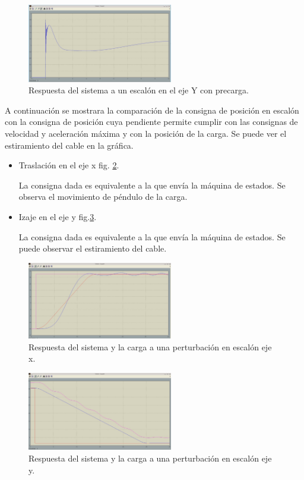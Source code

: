 \documentclass[journal]{IEEEtran}
\begin{document}
\begin{figure}[!t]
 \centering
  \includegraphics[width=2.5in]{Controlador_prec_res.jpeg}
  \caption{Respuesta del sistema a un escalón en el eje Y con precarga.}
  \label{fig:resyComp}
\end{figure}

A continuación se mostrara la comparación de la consigna de posición en escalón con
la consigna de posición cuya pendiente permite cumplir con las consignas de velocidad
y aceleración máxima y con la posición de la carga. Se puede ver el estiramiento del
cable en la gráfica.
\begin{itemize}
 \item Traslación en el eje x fig. \ref{fig:consposxxl}.
 
 La consigna dada es equivalente a la que envía la máquina de estados. Se observa
 el movimiento de péndulo de la carga.
 \item Izaje en el eje y fig.\ref{fig:consposyyl}.
 
  La consigna dada es equivalente a la que envía la máquina de estados. Se puede 
  observar el estiramiento del cable.
\end{itemize}

\begin{figure}[!t]
 \centering
  \includegraphics[width=2.5in]{consx_posx_xl.jpeg}
  \caption{Respuesta del sistema y la carga a una perturbación en escalón eje x.}
  \label{fig:consposxxl}
\end{figure}

\begin{figure}[!t]
 \centering
  \includegraphics[width=2.5in]{consy_posy_yl.jpeg}
  \caption{Respuesta del sistema y la carga a una perturbación en escalón eje y.}
  \label{fig:consposyyl}
\end{figure}
\end{document}
